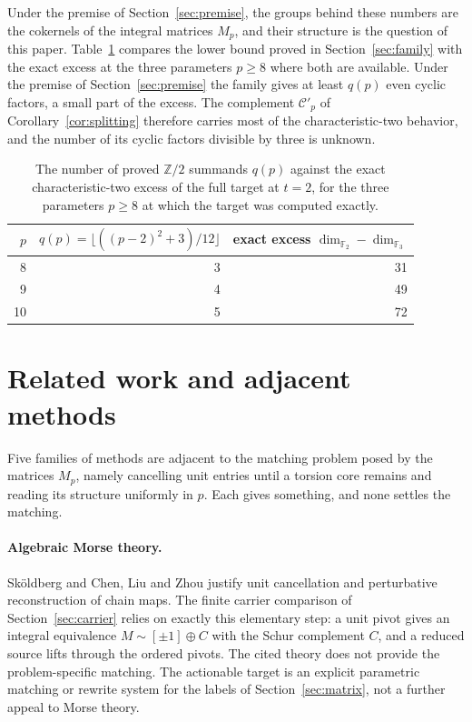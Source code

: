 \documentclass[11pt]{article}
\theoremstyle{definition}
\theoremstyle{remark}
\newcommand{\Z}{\mathbb Z}
\begin{document}
Under the premise of Section~\ref{sec:premise}, the groups behind these numbers
are the cokernels of the integral matrices $M_p$, and their structure is the
question of this paper.
Table~\ref{tab:excess} compares the lower bound proved in
Section~\ref{sec:family} with the exact excess at the three parameters
$p\geq8$ where both are available. Under the premise of
Section~\ref{sec:premise} the family gives at least $q(p)$ even cyclic factors,
a small part of the excess. The complement $\mathcal C'_p$ of
Corollary~\ref{cor:splitting} therefore carries most of the characteristic-two
behavior, and the number of its cyclic factors divisible by three is unknown.

\begin{table}[t]
\centering\small
\begin{tabular}{rrr}
\toprule
$p$ & $q(p)=\lfloor((p-2)^2+3)/12\rfloor$ & exact excess $\dim_{\mathbb F_2}-\dim_{\mathbb F_3}$\\
\midrule
8 & 3 & 31\\
9 & 4 & 49\\
10 & 5 & 72\\
\bottomrule
\end{tabular}
\caption{The number of proved $\Z/2$ summands $q(p)$ against the exact characteristic-two
excess of the full target at $t=2$, for the three parameters $p\geq8$ at which the target was
computed exactly.}
\label{tab:excess}
\end{table}

\section{Related work and adjacent methods}\label{sec:related}

Five families of methods are adjacent to the matching problem posed by the
matrices $M_p$, namely cancelling unit entries until a torsion core remains and
reading its structure uniformly in $p$. Each gives something, and none settles
the matching.

\paragraph{Algebraic Morse theory.} Sk\"oldberg \cite{Skoldberg} and Chen, Liu and
Zhou \cite{ChenLiuZhou} justify unit cancellation and perturbative reconstruction
of chain maps. The finite carrier comparison of Section~\ref{sec:carrier} relies on
exactly this elementary step: a unit pivot gives an integral equivalence
$M\sim[\pm1]\oplus C$ with the Schur complement $C$, and a reduced source lifts
through the ordered pivots. The cited theory does not provide the
problem-specific matching. The actionable target is an explicit parametric
matching or rewrite system for the labels of Section~\ref{sec:matrix}, not a
further appeal to Morse theory.
\end{document}
